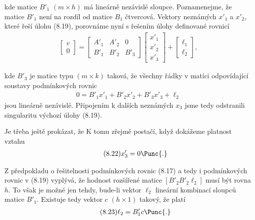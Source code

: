 \noindent
kde matice $B'_1$ $(m \times h)$ má lineárně nezávislé sloupce.
Poznamenejme,  že matice $B'_1$ není na rozdíl od matice
$B_1$ čtvercová.  Vektory neznámých $x'_1$ a $x'_2$, které řeší úlohu
(8.19), porovnáme nyní s řešením úlohy definované rovnicí
%
\begin{align*}
  \tag{8.20}
  \left[
    \begin{array}{c}
      v \\ 0
    \end{array}\right]
    =
    \left[\begin{array}{ccc}
      A'_1  & A'_2 & 0 \\
      B'_1  & B'_2 & B'_3
      \end{array}\right]
    \left[
      \begin{array}{c}
        x'_1 \\ x'_2 \\ x'_3
      \end{array}\right]
    +
    \left[
      \begin{array}{c}
        \ell_1 \\ \ell_2
      \end{array}\right]{,}
\end{align*}

\noindent
kde $B'_3$ je matice typu $(m \times k)$ taková, že všechny řádky v
matíci odpovídající soustavy podmínkových rovnic
%
\begin{align*}
  \tag{8.21}
  0 = B'_1x'_1 + B'_2x'_2 + B'_3x'_3 + \ell_2
\end{align*}
%
jsou lineárně nezávislé. Připojením k dalších neznámých $x_3$ jsme
tedy odstranili singularitu výchozí úlohy (8.19).


Je třeba ještě prokázat, že  K tomu zřejmě postačí, když
dokážeme platnost vztahu
%
\begin{align*}
  \tag{8.22}
  x'_3 = 0\Punc{.}
\end{align*}

\noindent
Z předpokladu o řešitelnosti podmínkových rovnic (8.17) a tedy
i podmínkových rovnic v (8.19) vyplývá, že hodnost rozšířené
matice $[ B'_2 B'_2 \ell_2 ]$ musí být rovna $h$. To však je možné jen
tehdy, bude-li vektor $\ell_2$ lineární kombinací sloupců matice $B'_1$.
Existuje tedy vektor $c$ $(h \times 1)$ takový, že platí
%
\begin{align*}
  \tag{8.23}
  \ell_2 = B'_1 c \Punc{.}
\end{align*}

